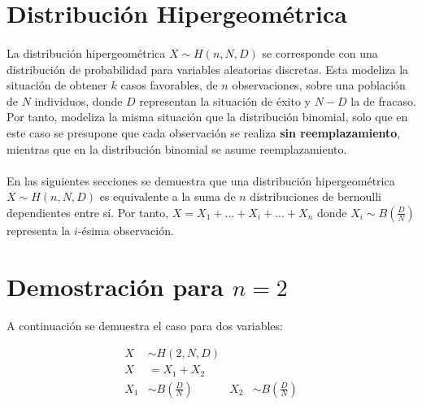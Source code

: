 \documentclass{article}
\begin{document}
	\maketitle
  \thispagestyle{empty}


  \section{Distribución Hipergeométrica}
  \label{sec:description}

    \paragraph{}
    La distribución hipergeométrica $X \sim H(n, N, D)$ se corresponde con una distribución de probabilidad para variables aleatorias discretas. Esta modeliza la situación de obtener $k$ casos favorables, de $n$ observaciones, sobre una población de $N$ individuos, donde $D$ representan la situación de éxito y $N-D$ la de fracaso. Por tanto, modeliza la misma situación que la distribución binomial, solo que en este caso se presupone que cada observación se realiza \textbf{sin reemplazamiento}, mientras que en la distribución binomial se asume reemplazamiento.

    \paragraph{}
    En las siguientes secciones se demuestra que una distribución hipergeométrica $X \sim H(n, N, D)$ es equivalente a la suma de $n$ distribuciones de bernoulli dependientes entre sí. Por tanto, $X = X_1 + ... + X_i + ... + X_n$ donde $X_i \sim B(\frac{D}{N})$ representa la $i$-ésima observación.

  \section{Demostración para $n=2$}
  \label{sec:demostration_1}

    \paragraph{}
    A continuación se demuestra el caso para dos variables:

    \begin{align}
      X   &\sim H(2, N, D) \\
      X   &= X_1 + X_2 \\
      X_1 &\sim B(\frac{D}{N}) & X_2 &\sim B(\frac{D}{N})
    \end{align}
\end{document}
